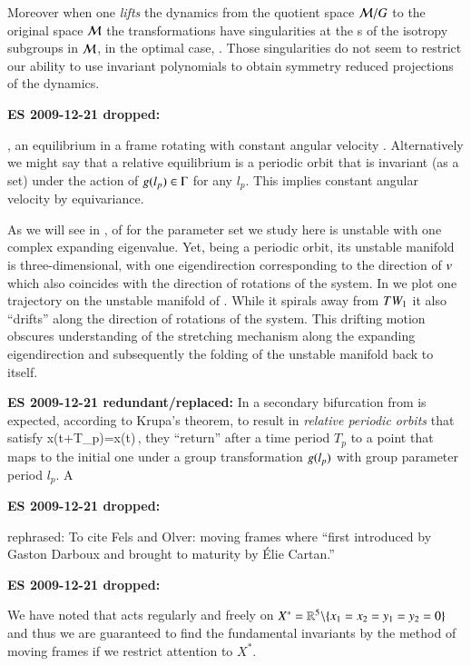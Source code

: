 Moreover when
one \emph{lifts} the dynamics from the quotient space
$\mathcal{M}/G$ to the original space $\mathcal{M}$ the transformations
have singularities at the \fixedsp s of
the isotropy subgroups in $\mathcal{M}$, in the optimal case, \cf
{}. Those singularities do not seem to
restrict our ability to use invariant polynomials to obtain
symmetry reduced projections of the dynamics.

{\bf ES 2009-12-21 dropped:}

, an equilibrium
in a frame rotating with constant angular velocity .
Alternatively we might say that a relative equilibrium is a
periodic orbit that is invariant (as a set) under the action
of $g(l_p)\in\Gamma$ for any $l_p$.
    This implies constant angular velocity by
    equivariance.

As we will see in ,  of {\cLe}
for the parameter set we study here is unstable with one
complex expanding eigenvalue. Yet, being a periodic orbit,
its unstable manifold is three-dimensional, with one
eigendirection corresponding to the direction of $v$ which
also coincides with the direction of rotations of the system.
In  we plot one trajectory on the unstable
manifold of . While it spirals away from
$TW_{1}$ it also ``drifts'' along the direction of
rotations of the system. This drifting motion obscures
understanding of the stretching mechanism along the expanding
eigendirection and subsequently the folding of the unstable
manifold back to itself.


{\bf ES 2009-12-21 redundant/replaced:}
In {\cLe} a secondary
bifurcation from  is expected, according to Krupa's
theorem, to result in \emph{relative periodic
orbits} that satisfy
\beq
	x(t+T_p)=x(t)\,,
\eeq
{\ie} they ``return'' after a time period $T_p$ to a point
that maps to the initial one under a group transformation
$g(l_p)$ with group parameter period $l_p$. A {\rpo}

{\bf ES 2009-12-21 dropped:}

rephrased: To cite Fels and Olver:
moving frames where ``first introduced by Gaston Darboux
and brought to maturity by \'Elie Cartan.''


{\bf ES 2009-12-21 dropped:}

We have noted that  acts regularly and freely on
$X^*=\mathbb{R}^{5}\backslash\{x_1=x_2=y_1=y_2=0\}$ and thus we are
guaranteed to find the fundamental invariants by the method
of moving frames if we restrict attention to $X^*$.


